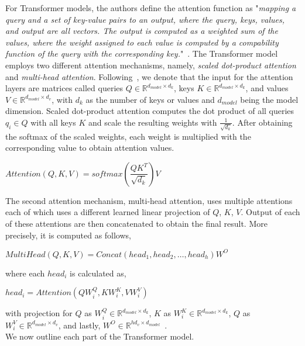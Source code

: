 For Transformer models, the authors define the attention function as "\emph{mapping a query and a set of key-value pairs to an output, where the query, keys, values, and output are all vectors. The output is computed as a weighted sum of the values, where the weight assigned to each value is computed by a compability function of the query with the corresponding key.}"~\parencite{AttentionIsAllYouNeed_Vaswani}. The Transformer model employs two different attention mechanisms, namely, \emph{scaled dot-product attention} and \emph{multi-head attention}. Following~\parencite{AttentionIsAllYouNeed_Vaswani}, we denote that the input for the attention layers are matrices called queries $Q \in \mathbb{R}^{d_{model} \times d_k}$, keys $K \in \mathbb{R}^{d_{model} \times d_k}$, and values $V \in \mathbb{R}^{d_{model} \times d_v}$, with $d_k$ as the number of keys or values and $d_{model}$ being the model dimension. Scaled dot-product attention computes the dot product of all queries $q_i \in Q$ with all keys $K$ and scale the resulting weights with $\frac{1}{\sqrt{d_k}}$. After obtaining the softmax of the scaled weights, each weight is multiplied with the corresponding value to obtain attention values.
\begin{center}
    $Attention(Q, K, V) = softmax(\dfrac{QK^T}{\sqrt{d_k}})V$
\end{center}
The second attention mechanism, multi-head attention, uses multiple attentions each of which uses a different learned linear projection of $Q$, $K$, $V$. Output of each of these attentions are then concatenated to obtain the final result. More precisely, it is computed as follows,
\begin{center}
    $MultiHead(Q, K, V) = Concat(head_1, head_2, \dots, head_h)W^{O}$
\end{center}
where each $head_i$ is calculated as,
\begin{center}
    $head_i = Attention(QW_i^Q, KW_i^K, VW_i^V)$
\end{center}
with projection for $Q$ as $W_i^Q \in \mathbb{R}^{d_{model} \times d_k}$, $K$ as $W_i^K \in \mathbb{R}^{d_{model} \times d_k}$, $Q$ as $W_i^V \in \mathbb{R}^{d_{model} \times d_v}$, and lastly, $W^{O} \in \mathbb{R}^{hd_v \times d_{model}}$~\parencite{AttentionIsAllYouNeed_Vaswani}.\\
We now outline each part of the Transformer model.\\
